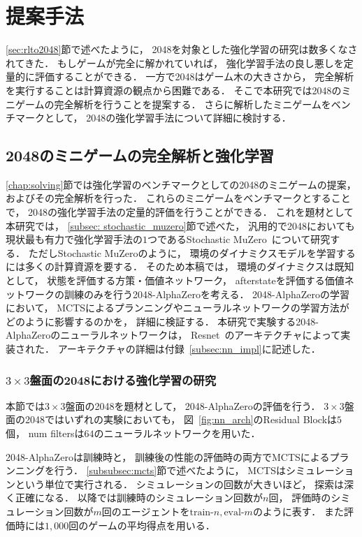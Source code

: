 \chapter{提案手法}
\label{chap:proposal}
\ref{sec:rlto2048}節で述べたように， 2048を対象とした強化学習の研究は数多くなされてきた．
もしゲームが完全に解かれていれば， 強化学習手法の良し悪しを定量的に評価することができる．
一方で2048はゲーム木の大きさから， 完全解析を実行することは計算資源の観点から困難である．
そこで本研究では2048のミニゲームの完全解析を行うことを提案する．
さらに解析したミニゲームをベンチマークとして， 2048の強化学習手法について詳細に検討する．



\section{2048のミニゲームの完全解析と強化学習}
\ref{chap:solving}節では強化学習のベンチマークとしての2048のミニゲームの提案， およびその完全解析を行った．
これらのミニゲームをベンチマークとすることで， 2048の強化学習手法の定量的評価を行うことができる．
これを題材として本研究では， \ref{subsec: stochastic_muzero}節で述べた， 汎用的で2048においても現状最も有力で強化学習手法の$1$つであるStochastic MuZero~\cite{StochasticMuZero}について研究する．
ただしStochastic MuZeroのように， 環境のダイナミクスモデルを学習するには多くの計算資源を要する．
そのため本稿では， 環境のダイナミクスは既知として， 状態を評価する方策・価値ネットワーク， afterstateを評価する価値ネットワークの訓練のみを行う2048-AlphaZeroを考える．
2048-AlphaZeroの学習において， MCTSによるプランニングやニューラルネットワークの学習方法がどのように影響するのかを， 詳細に検証する．
本研究で実験する2048-AlphaZeroのニューラルネットワークは， Resnet~\cite{Resnet}のアーキテクチャによって実装された．
アーキテクチャの詳細は付録~\ref{subsec:nn_impl}に記述した．

\subsection{$3\times3$盤面の2048における強化学習の研究}
本節では$3\times3$盤面の2048を題材として， 2048-AlphaZeroの評価を行う．
$3\times3$盤面の2048ではいずれの実験においても， 図~\ref{fig:nn_arch}のResidual Blockは$5$個， num filtersは$64$のニューラルネットワークを用いた．

2048-AlphaZeroは訓練時と， 訓練後の性能の評価時の両方でMCTSによるプランニングを行う．
\ref{subsubsec:mcts}節で述べたように， MCTSはシミュレーションという単位で実行される．
シミュレーションの回数が大きいほど， 探索は深く正確になる．
以降では訓練時のシミュレーション回数が$n$回， 評価時のシミュレーション回数が$m$回のエージェントを$\text{train-}n,\text{eval-}m$のように表す．
また評価時には$1,000$回のゲームの平均得点を用いる．

